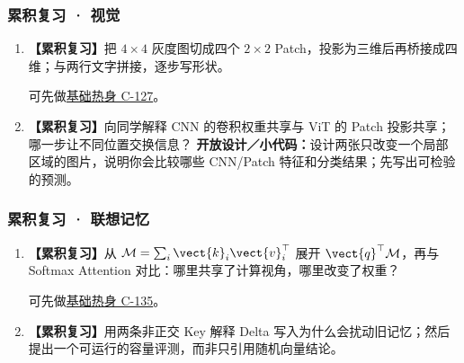 \subsubsection*{累积复习 · 视觉}
\begin{enumerate}[label={},leftmargin=4.8em,itemsep=4pt]
\item[\textbf{R-15.}] \leavevmode{}\label{exercise:R-15}\label{exercise:review-image-token-shapes}\textbf{【累积复习】}把 $4\times4$ 灰度图切成四个 $2\times2$ Patch，投影为三维后再桥接成四维；与两行文字拼接，逐步写形状。\par 可先做\hyperref[exercise:rectangular-patch-count]{基础热身 C-127}。
\item[\textbf{R-16.}] \leavevmode{}\label{exercise:R-16}\label{exercise:review-vision-sharing}\textbf{【累积复习】}向同学解释 CNN 的卷积权重共享与 ViT 的 Patch 投影共享；哪一步让不同位置交换信息？
\textbf{开放设计／小代码：}设计两张只改变一个局部区域的图片，说明你会比较哪些 CNN/Patch 特征和分类结果；先写出可检验的预测。
\end{enumerate}
\subsubsection*{累积复习 · 联想记忆}
\begin{enumerate}[label={},leftmargin=4.8em,itemsep=4pt]
\item[\textbf{R-17.}] \leavevmode{}\label{exercise:R-17}\label{exercise:review-memory-pipeline}\textbf{【累积复习】}从 $\mathcal{M}=\sum_i \vect{k}_i \vect{v}_i^\top$ 展开 $\vect{q}^\top\mathcal{M}$，再与 Softmax Attention 对比：哪里共享了计算视角，哪里改变了权重？\par 可先做\hyperref[exercise:memory-relu-read]{基础热身 C-135}。
\item[\textbf{R-18.}] \leavevmode{}\label{exercise:R-18}\label{exercise:review-memory-correction}\textbf{【累积复习】}用两条非正交 Key 解释 Delta 写入为什么会扰动旧记忆；然后提出一个可运行的容量评测，而非只引用随机向量结论。
\end{enumerate}
